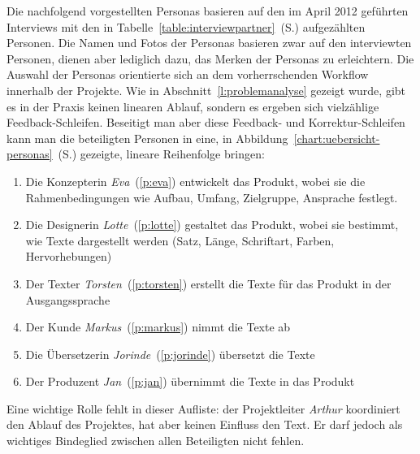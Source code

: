 Die nachfolgend vorgestellten Personas basieren auf den im April 2012 geführten Interviews mit den in Tabelle~\ref{table:interviewpartner}~(S.\pageref{table:interviewpartner}) aufgezählten Personen. Die Namen und Fotos der Personas basieren zwar auf den interviewten Personen, dienen aber lediglich dazu, das Merken der Personas zu erleichtern. Die Auswahl der Personas orientierte sich an dem vorherrschenden Workflow innerhalb der Projekte. Wie in Abschnitt~\ref{l:problemanalyse} gezeigt wurde, gibt es in der Praxis keinen linearen Ablauf, sondern es ergeben sich vielzählige Feedback-Schleifen. Beseitigt man aber diese Feedback- und Korrektur-Schleifen kann man die beteiligten Personen in eine, in Abbildung~\ref{chart:uebersicht-personas}~(S.\pageref{chart:uebersicht-personas}) gezeigte, lineare Reihenfolge bringen:
\begin{samepage}\begin{enumerate}\itemsep -5pt
\item Die Konzepterin \emph{Eva}~(\ref{p:eva}) entwickelt das Produkt, wobei sie die Rahmenbedingungen wie Aufbau, Umfang, Zielgruppe, Ansprache festlegt. 
\item Die Designerin \emph{Lotte}~(\ref{p:lotte}) gestaltet das Produkt, wobei sie bestimmt, wie Texte dargestellt werden (Satz, Länge, Schriftart, Farben, Hervorhebungen)
\item Der Texter \emph{Torsten}~(\ref{p:torsten}) erstellt die Texte für das Produkt in der Ausgangssprache
\item Der Kunde \emph{Markus}~(\ref{p:markus}) nimmt die Texte ab
\item Die Übersetzerin \emph{Jorinde}~(\ref{p:jorinde}) übersetzt die Texte
\item Der Produzent \emph{Jan}~(\ref{p:jan}) übernimmt die Texte in das Produkt
\end{enumerate}\end{samepage}

Eine wichtige Rolle fehlt in dieser Aufliste: der Projektleiter \emph{Arthur} koordiniert den Ablauf des Projektes, hat aber keinen Einfluss den Text. Er darf jedoch als wichtiges Bindeglied zwischen allen Beteiligten  nicht fehlen.


